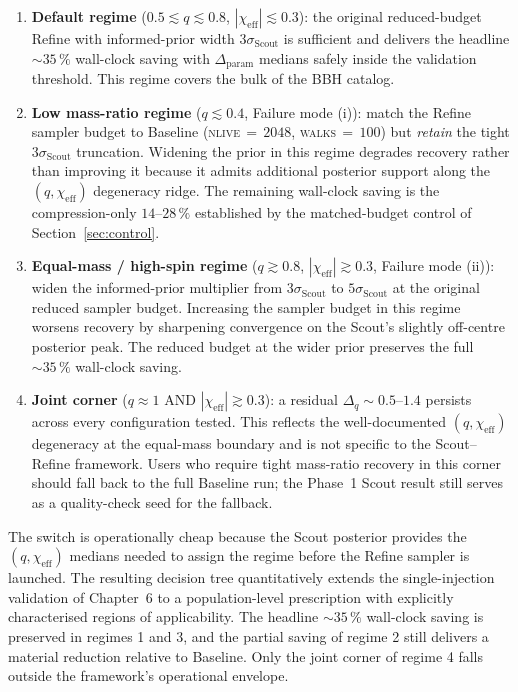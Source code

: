 \documentclass[12pt]{article}
\begin{document}
\begin{enumerate}
    \item \textbf{Default regime} ($0.5 \lesssim q \lesssim 0.8$, $|\chi_{\mathrm{eff}}| \lesssim 0.3$): the original reduced-budget Refine with informed-prior width $3\sigma_{\mathrm{Scout}}$ is sufficient and delivers the headline $\sim 35\,\%$ wall-clock saving with $\Delta_{\mathrm{param}}$ medians safely inside the validation threshold. This regime covers the bulk of the BBH catalog.
    \item \textbf{Low mass-ratio regime} ($q \lesssim 0.4$, Failure mode (i)): match the Refine sampler budget to Baseline (\textsc{nlive}$\,=\,2048$, \textsc{walks}$\,=\,100$) but \emph{retain} the tight $3\sigma_{\mathrm{Scout}}$ truncation. Widening the prior in this regime degrades recovery rather than improving it because it admits additional posterior support along the $(q,\chi_{\mathrm{eff}})$ degeneracy ridge. The remaining wall-clock saving is the compression-only $14$--$28\,\%$ established by the matched-budget control of Section~\ref{sec:control}.
    \item \textbf{Equal-mass / high-spin regime} ($q \gtrsim 0.8$, $|\chi_{\mathrm{eff}}| \gtrsim 0.3$, Failure mode (ii)): widen the informed-prior multiplier from $3\sigma_{\mathrm{Scout}}$ to $5\sigma_{\mathrm{Scout}}$ at the original reduced sampler budget. Increasing the sampler budget in this regime worsens recovery by sharpening convergence on the Scout's slightly off-centre posterior peak. The reduced budget at the wider prior preserves the full $\sim 35\,\%$ wall-clock saving.
    \item \textbf{Joint corner} ($q \approx 1$ AND $|\chi_{\mathrm{eff}}| \gtrsim 0.3$): a residual $\Delta_q \sim 0.5$--$1.4$ persists across every configuration tested. This reflects the well-documented $(q,\chi_{\mathrm{eff}})$ degeneracy at the equal-mass boundary \citep{Hannam2013,Vitale2014,Purrer2016} and is not specific to the Scout--Refine framework. Users who require tight mass-ratio recovery in this corner should fall back to the full Baseline run; the Phase~1 Scout result still serves as a quality-check seed for the fallback.
\end{enumerate}

The switch is operationally cheap because the Scout posterior provides
the $(q, \chi_{\mathrm{eff}})$ medians needed to assign the regime before
the Refine sampler is launched. The resulting decision tree
quantitatively extends the single-injection validation of Chapter~6 to a
population-level prescription with explicitly characterised regions of
applicability. The headline $\sim 35\,\%$ wall-clock saving is preserved
in regimes 1 and 3, and the partial saving of regime 2 still delivers a
material reduction relative to Baseline. Only the joint corner of
regime 4 falls outside the framework's operational envelope.
\end{document}

